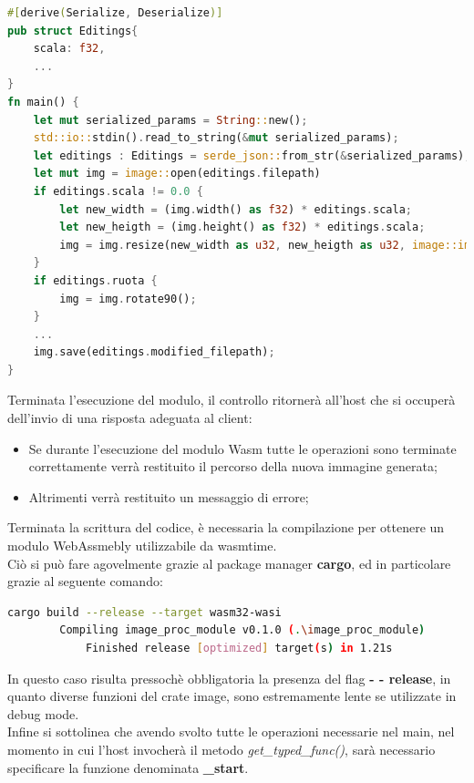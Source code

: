 \begin{lstlisting}[language=rust, caption={Codice Rust che successivamente verrà compilato in WebAssembly}, showstringspaces=false]
#[derive(Serialize, Deserialize)]
pub struct Editings{
    scala: f32,
    ...
}
fn main() {
    let mut serialized_params = String::new();
    std::io::stdin().read_to_string(&mut serialized_params);
    let editings : Editings = serde_json::from_str(&serialized_params);
    let mut img = image::open(editings.filepath)
    if editings.scala != 0.0 {
        let new_width = (img.width() as f32) * editings.scala;
        let new_heigth = (img.height() as f32) * editings.scala;
        img = img.resize(new_width as u32, new_heigth as u32, image::imageops::FilterType::Nearest);
    }
    if editings.ruota {
        img = img.rotate90();
    }
    ...
    img.save(editings.modified_filepath);
}
\end{lstlisting}
Terminata l'esecuzione del modulo, il controllo ritornerà all'host che si occuperà dell'invio di una risposta adeguata al client:
\begin{itemize}
    \item Se durante l'esecuzione del modulo Wasm tutte le operazioni sono terminate correttamente verrà restituito il percorso della nuova immagine generata;
    \item Altrimenti verrà restituito un messaggio di errore;
\end{itemize}
Terminata la scrittura del codice, è necessaria la compilazione per ottenere un modulo WebAssmebly utilizzabile da wasmtime.
\\Ciò si può fare agovelmente grazie al package manager \textbf{cargo}, ed in particolare grazie al seguente comando:
\begin{lstlisting}[language=Bash, numbers=none]
cargo build --release --target wasm32-wasi
        Compiling image_proc_module v0.1.0 (.\image_proc_module)
            Finished release [optimized] target(s) in 1.21s
\end{lstlisting}
In questo caso risulta pressochè obbligatoria la presenza del flag \textbf{- - release}, in quanto diverse funzioni del crate image, sono estremamente lente se utilizzate in debug mode.
\\Infine si sottolinea che avendo svolto tutte le operazioni necessarie nel main, nel momento in cui l'host invocherà il metodo \emph{get\_typed\_func()}, sarà necessario specificare la funzione denominata \textbf{\_start}.



\newpage
